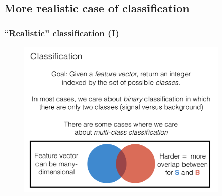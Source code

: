 \documentclass[hyperref={colorlinks=true}]{beamer}
\begin{document}
\subsection[More realistic case of classification]{More realistic case of classification}

\begin{frame}%
  \frametitle{``Realistic'' classification (I)}

  \vspace{-0.0cm}

  \begin{figure}
    \centering 
    \includegraphics[width=0.9\textwidth,page=10]{ClassifierSlides.pdf}
  \end{figure}

    
\end{frame}

\end{document}
